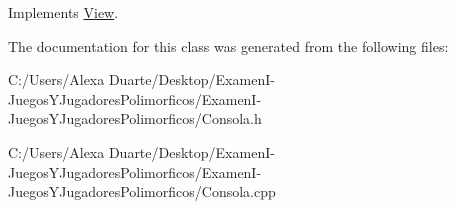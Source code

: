 Implements \hyperlink{class_view}{View}.



The documentation for this class was generated from the following files\+:\begin{DoxyCompactItemize}
\item 
C\+:/\+Users/\+Alexa Duarte/\+Desktop/\+Examen\+I-\/\+Juegos\+Y\+Jugadores\+Polimorficos/\+Examen\+I-\/\+Juegos\+Y\+Jugadores\+Polimorficos/Consola.\+h\item 
C\+:/\+Users/\+Alexa Duarte/\+Desktop/\+Examen\+I-\/\+Juegos\+Y\+Jugadores\+Polimorficos/\+Examen\+I-\/\+Juegos\+Y\+Jugadores\+Polimorficos/Consola.\+cpp\end{DoxyCompactItemize}
